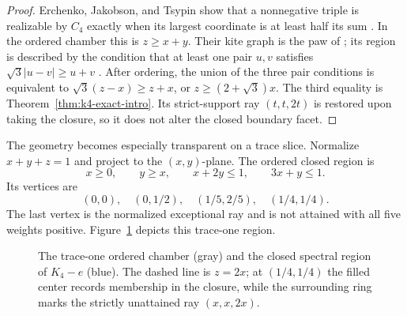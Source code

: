\documentclass[11pt,reqno]{amsart}
\theoremstyle{definition}
\theoremstyle{remark}
\begin{document}
\begin{proof}
Erchenko, Jakobson, and Tsypin show that a nonnegative triple is realizable by
$C_4$ exactly when its largest coordinate is at least half its sum
\cite[Theorem~4.1]{EJT2026}.  In the ordered chamber this is $z\ge x+y$.
Their kite graph is the paw of \cite{FGL2025}; its region is described by the
condition that at least one pair $u,v$ satisfies
$\sqrt3|u-v|\ge u+v$ \cite[Theorem~6.1]{EJT2026}.  After ordering, the union of
the three pair conditions is equivalent to
$\sqrt3(z-x)\ge z+x$, or $z\ge(2+\sqrt3)x$.  The third equality is
Theorem~\ref{thm:k4-exact-intro}.  Its strict-support ray
$(t,t,2t)$ is restored upon taking the closure, so it does not alter the
closed boundary facet.
\end{proof}

The geometry becomes especially transparent on a trace slice.  Normalize
$x+y+z=1$ and project to the $(x,y)$-plane.  The ordered closed region is
\begin{equation}\label{eq:k4-polygon}
  x\ge0,\qquad y\ge x,\qquad x+2y\le1,
  \qquad 3x+y\le1.
\end{equation}
Its vertices are
\[
  (0,0),\quad(0,1/2),\quad(1/5,2/5),\quad(1/4,1/4).
\]
The last vertex is the normalized exceptional ray and is not attained with
all five weights positive.  Figure~\ref{fig:k4-region} depicts this trace-one
region.

\begin{figure}[t]
\centering
{}
\caption{The trace-one ordered chamber (gray) and the closed spectral region
of $K_4-e$ (blue).  The dashed line is $z=2x$; at
$(1/4,1/4)$ the filled center records membership in the closure, while the
surrounding ring marks the strictly unattained ray $(x,x,2x)$.}
\label{fig:k4-region}
\end{figure}
\end{document}
